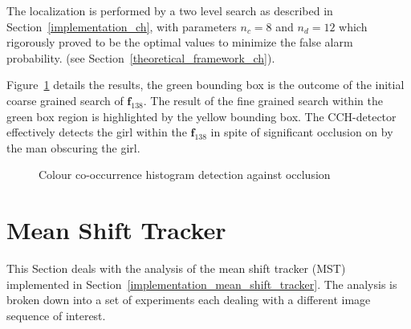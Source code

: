The localization is performed by a two level search as described in
Section~\ref{implementation_ch}, with parameters $n_c=8$ and $n_d=12$
which~\cite{Chang1999} rigorously proved to be the optimal values to minimize
the false alarm probability. (see Section~\ref{theoretical_framework_ch}).

Figure~\ref{fig:ch_partial_occlusion} details the results, the green bounding
box is the outcome of the initial coarse grained search of $\mathbf{f}_{138}$.
The result of the fine grained search within the green box region is highlighted
by the yellow bounding box. 
The CCH-detector effectively detects the girl within the $\mathbf{f}_{138}$ in
spite of significant occlusion on by the man obscuring the girl. 

\begin{figure}     
    \caption{Colour co-occurrence histogram detection against occlusion\label{fig:ch_partial_occlusion}
    }
\end{figure}

\section{Mean Shift Tracker}
This Section deals with the analysis of the mean shift tracker (MST)
implemented in Section~\ref{implementation_mean_shift_tracker}. The analysis is
broken down into a set of experiments each dealing with a different image
sequence of interest.


